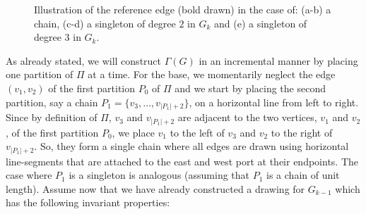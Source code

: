 \documentclass[a4paper,twoside,11pt]{article}
\begin{document}
\begin{figure}[t]
    \centering 
    \begin{minipage}[b]{.17\textwidth}
        \centering
    \end{minipage} 
    \begin{minipage}[b]{.17\textwidth}
        \centering 
    \end{minipage}
    \begin{minipage}[b]{.17\textwidth}
        \centering 
    \end{minipage}
    \begin{minipage}[b]{.17\textwidth}
        \centering 
    \end{minipage}
    \begin{minipage}[b]{.17\textwidth}
        \centering 
    \end{minipage}
    \caption{Illustration of the reference edge (bold drawn) in the case of: 
    (a-b) a chain, 
    (c-d) a singleton of degree $2$ in $G_k$ and 
    (e) a singleton of degree $3$ in $G_k$.}
    \label{fig:4p_ref}
\end{figure}

As already stated, we will construct $\Gamma(G)$ in an incremental
manner by placing one partition of $\Pi$ at a time. For the base, we
momentarily neglect the edge $(v_1, v_2)$ of the first partition
$P_0$ of $\Pi$ and we start by placing the second partition, say a
chain $P_1 = \{v_3 , \ldots ,v_{|P_1|+2} \}$, on a horizontal line from left to
right. Since by definition of $\Pi$, $v_3$ and $v_{|P_1|+2}$ are
adjacent to the two vertices, $v_1$ and $v_2$, of the first
partition $P_0$, we place $v_1$ to the left of $v_3$ and $v_2$ to the right of
$v_{|P_1|+2}$. So, they form a single chain where all edges are
drawn using horizontal line-segments that are attached to the east
and west port at their endpoints. The case where $P_1$ is a
singleton is analogous (assuming  that $P_1$ is a chain of unit
length). Assume now that we have already constructed a drawing for
$G_{k-1}$ which has the following invariant properties:
\end{document}
